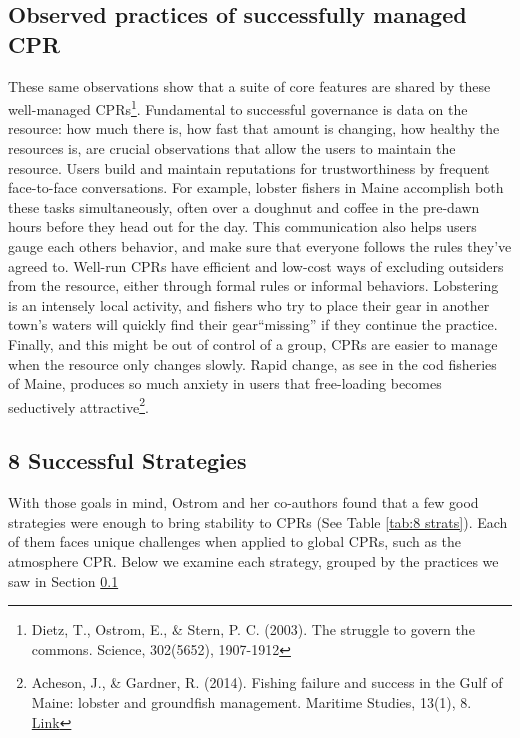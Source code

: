 \subsection{Observed practices of successfully managed CPR}\label{practices}
These same observations show that a suite of core features are shared by these well-managed CPRs\footnote{Dietz, T., Ostrom, E., \& Stern, P. C. (2003). The struggle to govern the commons. Science, 302(5652), 1907-1912}. Fundamental to successful governance is data on the resource: how much there is, how fast that amount is changing, how healthy the resources is, are crucial observations that allow the users to maintain the resource. Users build and maintain reputations for trustworthiness by frequent face-to-face conversations. For example, lobster fishers in Maine accomplish both these tasks simultaneously, often over a doughnut and coffee in the pre-dawn hours before they head out for the day. This communication also helps users gauge each others behavior, and make sure that everyone follows the rules they've agreed to. Well-run CPRs have efficient and low-cost ways of excluding outsiders from the resource, either through formal rules or informal behaviors. Lobstering is an intensely local activity, and fishers who try to place their gear in another town's waters will quickly find their gear``missing'' if they continue the practice. Finally, and this might be out of control of a group, CPRs are easier to manage when the resource only changes slowly. Rapid change, as see in the cod fisheries of Maine, produces so much anxiety in users that free-loading becomes seductively attractive\footnote{Acheson, J., \& Gardner, R. (2014). Fishing failure and success in the Gulf of Maine: lobster and groundfish management. Maritime Studies, 13(1), 8. \href{https://doi.org/10.1186/2212-9790-13-8}{Link}}. 
   
\subsection{8 Successful Strategies}\label{no_toc}
With those goals in mind, Ostrom and her co-authors found that a few good strategies were enough to bring stability to CPRs (See Table \ref{tab:8 strats}). Each of them faces unique challenges when applied to global CPRs, such as the atmosphere CPR. Below we examine each strategy, grouped by the practices we saw in Section \ref{practices}

